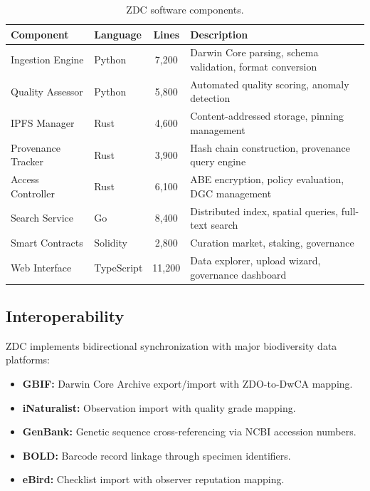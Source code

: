 \begin{table}[H]
\centering
\caption{ZDC software components.}
\label{tab:software}
\begin{tabularx}{\textwidth}{@{}llcX@{}}
\toprule
\textbf{Component} & \textbf{Language} & \textbf{Lines} & \textbf{Description} \\
\midrule
Ingestion Engine & Python & 7,200 & Darwin Core parsing, schema validation, format conversion \\
Quality Assessor & Python & 5,800 & Automated quality scoring, anomaly detection \\
IPFS Manager & Rust & 4,600 & Content-addressed storage, pinning management \\
Provenance Tracker & Rust & 3,900 & Hash chain construction, provenance query engine \\
Access Controller & Rust & 6,100 & ABE encryption, policy evaluation, DGC management \\
Search Service & Go & 8,400 & Distributed index, spatial queries, full-text search \\
Smart Contracts & Solidity & 2,800 & Curation market, staking, governance \\
Web Interface & TypeScript & 11,200 & Data explorer, upload wizard, governance dashboard \\
\bottomrule
\end{tabularx}
\end{table}

\subsection{Interoperability}

ZDC implements bidirectional synchronization with major biodiversity data platforms:

\begin{itemize}[leftmargin=*]
    \item \textbf{GBIF:} Darwin Core Archive export/import with ZDO-to-DwCA mapping.
    \item \textbf{iNaturalist:} Observation import with quality grade mapping.
    \item \textbf{GenBank:} Genetic sequence cross-referencing via NCBI accession numbers.
    \item \textbf{BOLD:} Barcode record linkage through specimen identifiers.
    \item \textbf{eBird:} Checklist import with observer reputation mapping.
\end{itemize}

